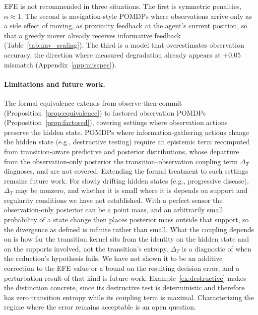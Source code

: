 EFE is not recommended in three situations. The first is symmetric penalties, $\alpha \approx 1$. The second is navigation-style POMDPs where observations arrive only as a side effect of moving, as proximity feedback at the agent's current position, so that a greedy mover already receives informative feedback (Table~\ref{tab:nav_scaling}). The third is a model that overestimates observation accuracy, the direction where measured degradation already appears at $+0.05$ mismatch (Appendix~\ref{app:misspec}).

\paragraph{Limitations and future work.}
The formal equivalence extends from observe-then-commit (Proposition~\ref{prop:equivalence}) to factored observation POMDPs (Proposition~\ref{prop:factored}), covering settings where observation actions preserve the hidden state. POMDPs where information-gathering actions change the hidden state (e.g., destructive testing) require an epistemic term recomputed from transition-aware predictive and posterior distributions, whose departure from the observation-only posterior the transition--observation coupling term $\Delta_T$ diagnoses, and are not covered. Extending the formal treatment to such settings remains future work. For slowly drifting hidden states (e.g., progressive disease), $\Delta_T$ may be nonzero, and whether it is small where it is depends on support and regularity conditions we have not established. With a perfect sensor the observation-only posterior can be a point mass, and an arbitrarily small probability of a state change then places posterior mass outside that support, so the divergence as defined is infinite rather than small. What the coupling depends on is how far the transition kernel sits from the identity on the hidden state and on the supports involved, not the transition's entropy. $\Delta_T$ is a diagnostic of when the reduction's hypothesis fails. We have not shown it to be an additive correction to the EFE value or a bound on the resulting decision error, and a perturbation result of that kind is future work. Example~\ref{ex:destructive} makes the distinction concrete, since its destructive test is deterministic and therefore has zero transition entropy while its coupling term is maximal. Characterizing the regime where the error remains acceptable is an open question.

